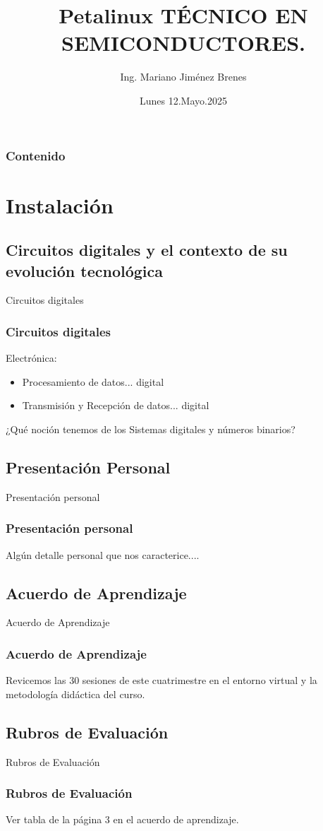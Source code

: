 \documentclass[11pt]{beamer}
\author{Ing. Mariano Jim\'enez Brenes}
\title
{
Petalinux \linebreak 
T\'ECNICO EN SEMICONDUCTORES.
}
\institute{
Universidad Castro Carazo\linebreak
T\'ecnico En Semiconductores
}
\date{Lunes 12.Mayo.2025}
\begin{document}
\begin{frame}
\maketitle 
\end{frame}

\logo{}

\begin{frame}
\frametitle{Contenido}
\tableofcontents
\end{frame}


\section{Instalaci\'on}
\subsection{Circuitos digitales y el
contexto de su evoluci\'on
tecnol\'ogica}
\begin{frame}{Circuitos digitales}
\frametitle{Circuitos digitales}
Electr\'onica:
	\begin{itemize}
		\item Procesamiento de datos... digital
		\item Transmisi\'on y Recepci\'on de datos... digital
	\end{itemize}
	¿Qu\'e noci\'on tenemos de los Sistemas digitales y n\'umeros binarios?
\end{frame}
\subsection{Presentaci\'on Personal}
\begin{frame}{Presentaci\'on personal}
\frametitle{Presentaci\'on personal}
Alg\'un detalle personal que nos caracterice....
\end{frame}
\subsection{Acuerdo de Aprendizaje}
\begin{frame}{Acuerdo de Aprendizaje}
\frametitle{Acuerdo de Aprendizaje}
Revicemos las 30 sesiones de este cuatrimestre en el entorno virtual  y la metodolog\'ia did\'actica del curso.
\end{frame}
\subsection{Rubros de Evaluaci\'on}
\begin{frame}{Rubros de Evaluaci\'on}
\frametitle{Rubros de Evaluaci\'on}
Ver tabla de la p\'agina 3 en el acuerdo de aprendizaje.
\end{frame}
\end{document}
